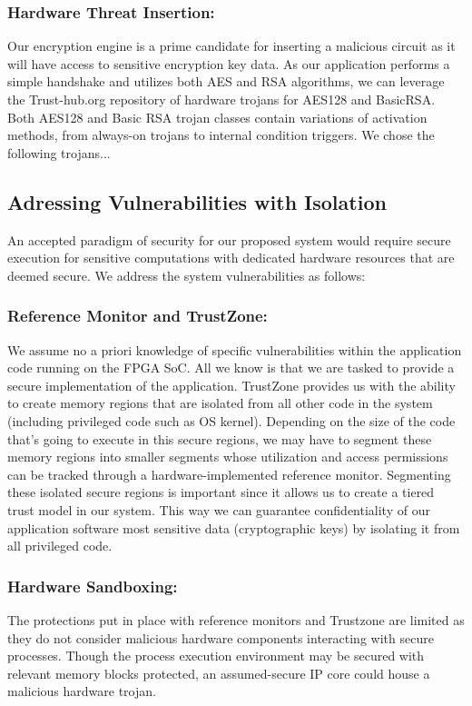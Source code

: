 \documentclass[sigconf]{acmart}
\theoremstyle{plain}
\theoremstyle{remark}
\begin{document}
\subsubsection{Hardware Threat Insertion:}

Our encryption engine is a prime candidate for inserting a malicious circuit as it will have access to sensitive encryption key data. As our application performs a simple handshake and utilizes both AES and RSA algorithms, we can leverage the Trust-hub.org repository of hardware trojans for AES128 and BasicRSA. Both AES128 and Basic RSA trojan classes contain variations of activation methods, from always-on trojans to internal condition triggers. We chose the following trojans...

\subsection{Adressing Vulnerabilities with Isolation}
An accepted paradigm of security for our proposed system would require secure execution for sensitive computations with dedicated hardware resources that are deemed secure. We address the system vulnerabilities as follows:

\subsubsection{Reference Monitor and TrustZone:}
We assume no a priori knowledge of specific vulnerabilities within the application code running on the FPGA SoC. All we know is that we are tasked to provide a secure implementation of the application. TrustZone provides us with the ability to create memory regions that are isolated from all other code in the system (including privileged code such as OS kernel). Depending on the size of the code that's going to execute in this secure regions, we may have to segment these memory regions into smaller segments whose utilization and access permissions can be tracked through a hardware-implemented reference monitor. Segmenting these isolated secure regions is important since it allows us to create a tiered trust model in our system. This way we can guarantee confidentiality of our application software most sensitive data (cryptographic keys) by isolating it from all privileged code. 


\subsubsection{Hardware Sandboxing:}
The protections put in place with reference monitors and Trustzone are limited as they do not consider malicious hardware components interacting with secure processes. Though the process execution environment may be secured with relevant memory blocks protected, an assumed-secure IP core could house a malicious hardware trojan.
\end{document}
